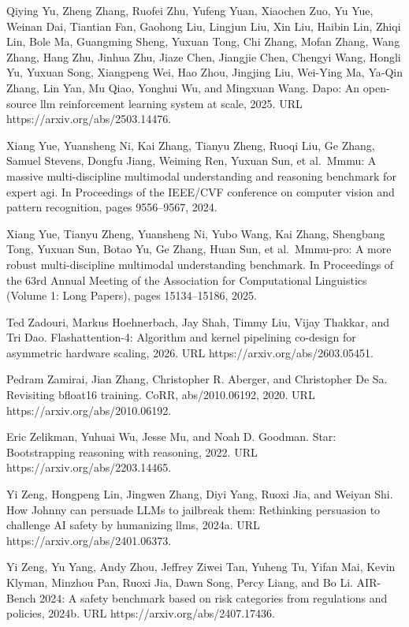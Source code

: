 \documentclass[
  10
]{article}
\begin{document}
Qiying Yu, Zheng Zhang, Ruofei Zhu, Yufeng Yuan, Xiaochen Zuo, Yu Yue,
Weinan Dai, Tiantian Fan, Gaohong Liu, Lingjun Liu, Xin Liu, Haibin Lin,
Zhiqi Lin, Bole Ma, Guangming Sheng, Yuxuan Tong, Chi Zhang, Mofan
Zhang, Wang Zhang, Hang Zhu, Jinhua Zhu, Jiaze Chen, Jiangjie Chen,
Chengyi Wang, Hongli Yu, Yuxuan Song, Xiangpeng Wei, Hao Zhou, Jingjing
Liu, Wei-Ying Ma, Ya-Qin Zhang, Lin Yan, Mu Qiao, Yonghui Wu, and
Mingxuan Wang. Dapo: An open-source llm reinforcement learning system at
scale, 2025. URL https://arxiv.org/abs/2503.14476.

Xiang Yue, Yuansheng Ni, Kai Zhang, Tianyu Zheng, Ruoqi Liu, Ge Zhang,
Samuel Stevens, Dongfu Jiang, Weiming Ren, Yuxuan Sun, et al.~Mmmu: A
massive multi-discipline multimodal understanding and reasoning
benchmark for expert agi. In Proceedings of the IEEE/CVF conference on
computer vision and pattern recognition, pages 9556--9567, 2024.

Xiang Yue, Tianyu Zheng, Yuansheng Ni, Yubo Wang, Kai Zhang, Shengbang
Tong, Yuxuan Sun, Botao Yu, Ge Zhang, Huan Sun, et al.~Mmmu-pro: A more
robust multi-discipline multimodal understanding benchmark. In
Proceedings of the 63rd Annual Meeting of the Association for
Computational Linguistics (Volume 1: Long Papers), pages 15134--15186,
2025.

Ted Zadouri, Markus Hoehnerbach, Jay Shah, Timmy Liu, Vijay Thakkar, and
Tri Dao. Flashattention-4: Algorithm and kernel pipelining co-design for
asymmetric hardware scaling, 2026. URL https://arxiv.org/abs/2603.05451.

Pedram Zamirai, Jian Zhang, Christopher R. Aberger, and Christopher De
Sa. Revisiting bfloat16 training. CoRR, abs/2010.06192, 2020. URL
https://arxiv.org/abs/2010.06192.

Eric Zelikman, Yuhuai Wu, Jesse Mu, and Noah D. Goodman. Star:
Bootstrapping reasoning with reasoning, 2022. URL
https://arxiv.org/abs/2203.14465.

Yi Zeng, Hongpeng Lin, Jingwen Zhang, Diyi Yang, Ruoxi Jia, and Weiyan
Shi. How Johnny can persuade LLMs to jailbreak them: Rethinking
persuasion to challenge AI safety by humanizing llms, 2024a. URL
https://arxiv.org/abs/2401.06373.

Yi Zeng, Yu Yang, Andy Zhou, Jeffrey Ziwei Tan, Yuheng Tu, Yifan Mai,
Kevin Klyman, Minzhou Pan, Ruoxi Jia, Dawn Song, Percy Liang, and Bo Li.
AIR-Bench 2024: A safety benchmark based on risk categories from
regulations and policies, 2024b. URL https://arxiv.org/abs/2407.17436.
\end{document}
